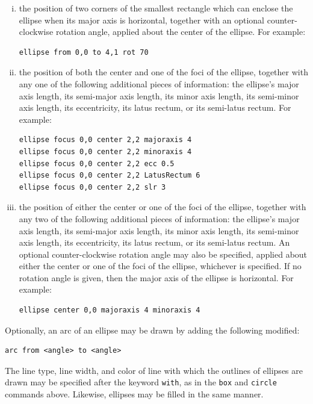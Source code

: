\begin{enumerate}[(i)]
\item the position of two corners of the smallest rectangle which can enclose
the ellipse when its major axis is horizontal, together with an optional
counter-clockwise rotation angle, applied about the center of the ellipse.
For example:

\begin{verbatim}
ellipse from 0,0 to 4,1 rot 70
\end{verbatim}

\item the position of both the center and one of the foci of the ellipse,
together with any one of the following additional pieces of information: the
ellipse's major axis length, its semi-major axis length, its minor axis length,
its semi-minor axis length, its eccentricity, its latus rectum, or its
semi-latus rectum.  For example:

\begin{verbatim}
ellipse focus 0,0 center 2,2 majoraxis 4
ellipse focus 0,0 center 2,2 minoraxis 4
ellipse focus 0,0 center 2,2 ecc 0.5
ellipse focus 0,0 center 2,2 LatusRectum 6
ellipse focus 0,0 center 2,2 slr 3
\end{verbatim}

\item the position of either the center or one of the foci of the ellipse,
together with any two of the following additional pieces of information: the
ellipse's major axis length, its semi-major axis length, its minor axis length,
its semi-minor axis length, its eccentricity, its latus rectum, or its
semi-latus rectum. An optional counter-clockwise rotation angle may also be
specified, applied about either the center or one of the foci of the ellipse,
whichever is specified. If no rotation angle is given, then the major axis of
the ellipse is horizontal.  For example:

\begin{verbatim}
ellipse center 0,0 majoraxis 4 minoraxis 4
\end{verbatim}
\end{enumerate}

Optionally, an arc of an ellipse may be drawn by adding the following modified:

\begin{verbatim}
arc from <angle> to <angle>
\end{verbatim}

The line type, line width, and color of line with which the outlines of
ellipses are drawn may be specified after the keyword {\tt with}, as in the
{\tt box} and {\tt circle} commands above. Likewise, ellipses may be filled in
the same manner.

